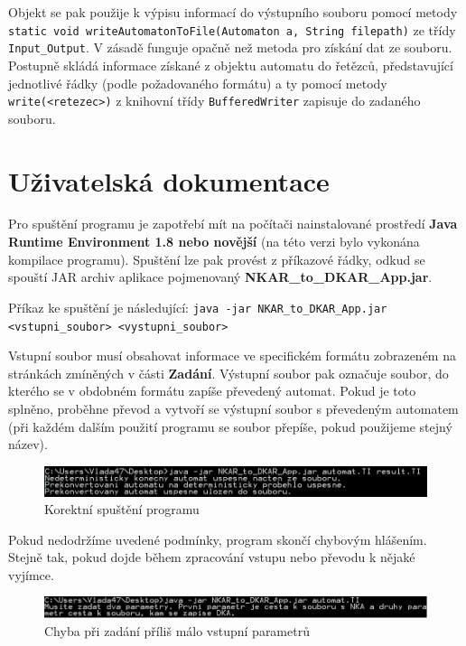 \documentclass[11pt]{article}
\begin{document}
Objekt se pak použije k výpisu informací do výstupního souboru pomocí metody \texttt{static void writeAutomatonToFile(Automaton a, String filepath)} ze třídy \texttt{Input\_Output}. V zásadě funguje opačně než metoda pro získání dat ze souboru. Postupně skládá informace získané z objektu automatu do řetězců, představující jednotlivé řádky (podle požadovaného formátu) a ty pomocí metody \texttt{write(<retezec>)} z knihovní třídy \texttt{BufferedWriter} zapisuje do zadaného souboru. 

\newpage

\section{Uživatelská dokumentace}

Pro spuštění programu je zapotřebí mít na počítači nainstalované prostředí \textbf{Java Runtime Environment 1.8 nebo novější} (na této verzi bylo vykonána kompilace programu). Spuštění lze pak provést z příkazové řádky, odkud se spouští JAR archiv aplikace pojmenovaný \textbf{NKAR\_to\_DKAR\_App.jar}.

Příkaz ke spuštění je následující: \texttt{java -jar NKAR\_to\_DKAR\_App.jar <vstupni\_soubor> <vystupni\_soubor>}

Vstupní soubor musí obsahovat informace ve specifickém formátu zobrazeném na stránkách zmíněných v části \textbf{Zadání}. Výstupní soubor pak označuje soubor, do kterého se v obdobném formátu zapíše převedený automat. Pokud je toto splněno, proběhne převod a vytvoří se výstupní soubor s převedeným automatem (při každém dalším použití programu se soubor přepíše, pokud použijeme stejný název).

\begin{figure}[htbp]
\centering
\includegraphics[width = 15cm]{success.jpg}
\begin{center}
\caption{Korektní spuštění programu}
\end{center}
\end{figure}

Pokud nedodržíme uvedené podmínky, program skončí chybovým hlášením. Stejně tak, pokud dojde během zpracování vstupu nebo převodu k nějaké vyjímce.

\begin{figure}[htbp]
\centering
\includegraphics[width = 15cm]{fail.jpg}
\begin{center}
\caption{Chyba při zadání příliš málo vstupní parametrů}
\end{center}
\end{figure}
\end{document}
